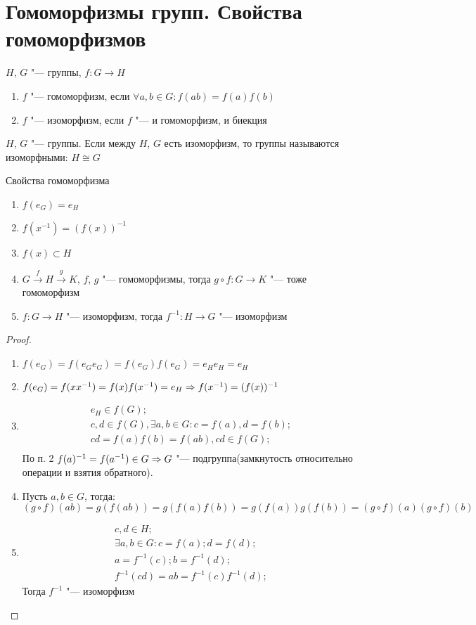 \section{Гомоморфизмы групп. Свойства гомоморфизмов}
\begin{Def}
	$H$, $G$ "--- группы, $f: G \to H$
	\begin{enumerate}
		\item $f$ "--- гомоморфизм, если $\forall a, b \in G \colon f(ab) = f(a)f(b)$
		\item $f$ "--- изоморфизм, если $f$ "--- и гомоморфизм, и биекция
	\end{enumerate}
\end{Def}

\begin{Def}
	$H$, $G$ "--- группы. Если между $H$, $G$ есть изоморфизм, то группы называются изоморфными: $H \cong G$
\end{Def}						

\begin{theorem}{Свойства гомоморфизма}
	\begin{enumerate}
		\item $f(e_G) = e_H$
		\item $f(x^{-1}) = (f(x))^{-1}$
		\item $f(x) \subset H$
		\item $G \xrightarrow{f} H \xrightarrow{g} K$, $f$, $g$ "--- гомоморфизмы, тогда $g \circ f: G \to K$ "--- тоже гомоморфизм
		\item $f: G \to H$ "--- изоморфизм, тогда $f^{-1}: H \to G$ "--- изоморфизм
	\end{enumerate}
\end{theorem}
\begin{proof}
	\begin{enumerate}
		\item $f(e_G) = f(e_G e_G) = f(e_G)f(e_G) = e_H e_H = e_H$
		\item $f(e_G) = f(x x^{-1}) = f(x)f(x^{-1}) = e_H \Rightarrow f(x^{-1}) = (f(x))^{-1}$
		\item
		    \begin{gather*}
			e_H \in f(G); \\
			c, d \in f(G), \exists a, b \in G\colon c = f(a), d = f(b); \\
			cd = f(a)f(b) = f(ab), cd \in f(G); \\
			\end{gather*}
			По п. 2 $f(a)^{-1} = f(a^{-1}) \in G \Rightarrow G$ "--- подгруппа(замкнутость относительно операции и взятия обратного).
		\item Пусть $a, b \in G$, тогда:
			\[(g \circ f)(ab) = g(f(ab)) = g(f(a)f(b)) = g(f(a))g(f(b)) = (g \circ f)(a)(g \circ f)(b)\]
		\item
			\begin{gather*}
			c, d \in H; \\
			\exists a, b \in G\colon c = f(a); d = f(d); \\
			a = f^{-1}(c); b = f^{-1}(d); \\
			f^{-1}(cd) = ab = f^{-1}(c)f^{-1}(d);
			\end{gather*}
			Тогда $f^{-1}$ "--- изоморфизм
	\end{enumerate}   
\end{proof}		

